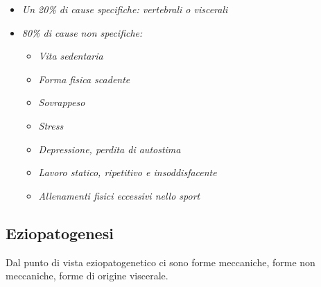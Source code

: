 \begin{itemize}
\item
  \emph{Un 20\% di cause specifiche: vertebrali o viscerali}
\item
  \emph{80\% di cause non specifiche: }

\begin{itemize}
\item
  \emph{Vita sedentaria}
\item
  \emph{Forma fisica scadente}
\item
  \emph{Sovrappeso}
\item
  \emph{Stress}
\item
  \emph{Depressione, perdita di autostima}
\item
  \emph{Lavoro statico, ripetitivo e insoddisfacente}
\item
  \emph{Allenamenti fisici eccessivi nello sport }
\end{itemize}
\end{itemize}
\subsection{Eziopatogenesi}


Dal punto di vista eziopatogenetico ci sono forme meccaniche, forme non
meccaniche, forme di origine viscerale.

